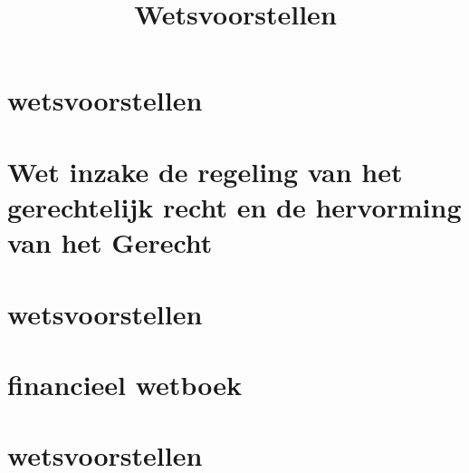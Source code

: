 \documentclass{article}
\title{Wetsvoorstellen}
\begin{document}
\maketitle
\tableofcontents
\chapter{wetsvoorstellen}

\chapter{Wet inzake de regeling van het gerechtelijk recht en de hervorming van het Gerecht}


\chapter{wetsvoorstellen}



\chapter{financieel wetboek}


\chapter{wetsvoorstellen}



\end{document}
